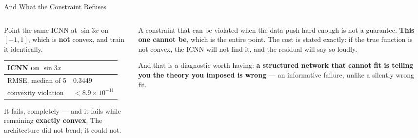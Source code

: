 \begin{frame}{And What the Constraint Refuses}
\begin{columns}[T]
\begin{column}{0.53\textwidth}
\small
Point the same ICNN at $\sin 3x$ on $[-1,1]$, which is \textbf{not} convex, and train it identically.
\medskip

\begin{center}\footnotesize
\begin{tabularx}{\linewidth}{@{}>{\raggedright\arraybackslash}X >{\raggedleft\arraybackslash}p{2.2cm}@{}}
\toprule
\textbf{ICNN on $\sin 3x$} & \\
\midrule
RMSE, median of 5 & $0.3449$ \\
convexity violation & $<8.9\times10^{-11}$ \\
\bottomrule
\end{tabularx}
\end{center}
\medskip

It fails, completely --- and it fails while remaining \textbf{exactly convex}. The architecture did not bend; it could not.
\end{column}
\begin{column}{0.44\textwidth}
\begin{takeawaybox}[title=\textbf{This is the guarantee, from the other side}]\small
A constraint that can be violated when the data push hard enough is not a guarantee. \textbf{This one cannot be}, which is the entire point.
\medskip
The cost is stated exactly: if the true function is not convex, the ICNN will not find it, and the residual will say so loudly.
\end{takeawaybox}
\medskip
{\footnotesize And that is a diagnostic worth having: \textbf{a structured network that cannot fit is telling you the theory you imposed is wrong} --- an informative failure, unlike a silently wrong fit.}
\end{column}
\end{columns}
\vspace{1mm}
\end{frame}

